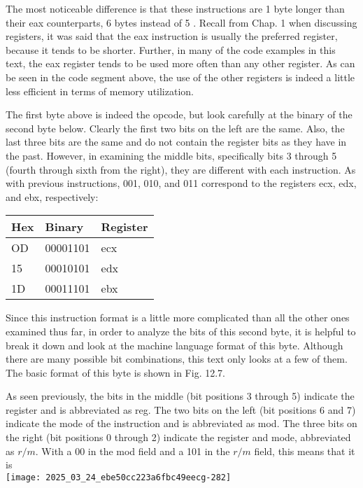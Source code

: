 \documentclass[10pt]{article}
\begin{document}
The most noticeable difference is that these instructions are 1 byte longer than their eax counterparts, 6 bytes instead of 5 . Recall from Chap. 1 when discussing registers, it was said that the eax instruction is usually the preferred register, because it tends to be shorter. Further, in many of the code examples in this text, the eax register tends to be used more often than any other register. As can be seen in the code segment above, the use of the other registers is indeed a little less efficient in terms of memory utilization.

The first byte above is indeed the opcode, but look carefully at the binary of the second byte below. Clearly the first two bits on the left are the same. Also, the last three bits are the same and do not contain the register bits as they have in the past. However, in examining the middle bits, specifically bits 3 through 5 (fourth through sixth from the right), they are different with each instruction. As with previous instructions, 001, 010, and 011 correspond to the registers ecx, edx, and ebx, respectively:

\begin{center}
\begin{tabular}{|l|l|l|}
\hline
Hex & Binary & Register \\
\hline
OD & 00001101 & ecx \\
\hline
15 & 00010101 & edx \\
\hline
1D & 00011101 & ebx \\
\hline
\end{tabular}
\end{center}

Since this instruction format is a little more complicated than all the other ones examined thus far, in order to analyze the bits of this second byte, it is helpful to break it down and look at the machine language format of this byte. Although there are many possible bit combinations, this text only looks at a few of them. The basic format of this byte is shown in Fig. 12.7.

As seen previously, the bits in the middle (bit positions 3 through 5) indicate the register and is abbreviated as reg. The two bits on the left (bit positions 6 and 7) indicate the mode of the instruction and is abbreviated as mod. The three bits on the right (bit positions 0 through 2) indicate the register and mode, abbreviated as $r / m$. With a 00 in the mod field and a 101 in the $r / m$ field, this means that it is\\
\texttt{[image: 2025\_03\_24\_ebe50cc223a6fbc49eecg-282]}
\end{document}
